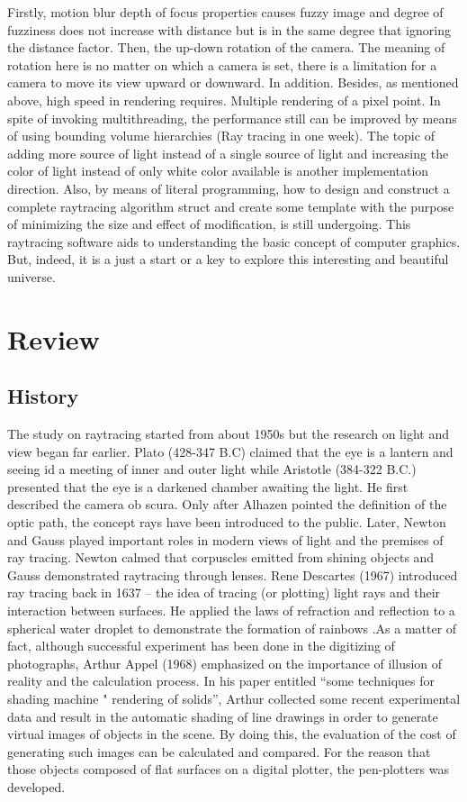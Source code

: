 \documentclass[11pt]{article}
\begin{document}
Firstly, motion blur depth of focus properties causes fuzzy image and degree of fuzziness does not increase with distance but is in the same degree that ignoring the distance factor. Then, the up-down rotation of the camera. The meaning of rotation here is no matter on which a camera is set, there is a limitation for a camera to move its view upward or downward. In addition. Besides, as mentioned above, high speed in rendering requires. Multiple rendering of a pixel point. In spite of invoking multithreading, the performance still can be improved by means of using bounding volume hierarchies (Ray tracing in one week). The topic of adding more source of light instead of a single source of light and increasing the color of light instead of only white color available is another implementation direction.
Also, by means of literal programming, how to design and construct a complete raytracing algorithm struct and create some template with the purpose of minimizing the size and effect of modification, is still undergoing. This raytracing software aids to understanding the basic concept of computer graphics. But, indeed, it is a just a start or a key to explore this interesting and beautiful universe.

\section{Review}
\subsection{History}
The study on raytracing started from about 1950s but the research on light and view began far earlier. Plato (428-347 B.C) claimed that the eye is a lantern and seeing id a meeting of inner and outer light while Aristotle (384-322 B.C.) presented that the eye is a darkened chamber awaiting the light. He first described the camera ob scura. Only after Alhazen pointed the definition of the optic path, the concept rays have been introduced to the public.
Later, Newton and Gauss played important roles in modern views of light and the premises of ray tracing. Newton calmed that corpuscles emitted from shining objects and Gauss demonstrated raytracing through lenses. Rene Descartes (1967) introduced ray tracing back in 1637 – the idea of tracing (or plotting) light rays and their interaction between surfaces. He applied the laws of refraction and reflection to a spherical water droplet to demonstrate the formation of rainbows .As a matter of fact, although successful experiment has been done in the digitizing of photographs, Arthur Appel (1968) emphasized on the importance of illusion of reality and the calculation process. In his paper entitled “some techniques for shading machine " rendering of solids”, Arthur collected some recent experimental data and result in the automatic shading of line drawings in order to generate virtual images of objects in the scene. By doing this, the evaluation of the cost of generating such images can be calculated and compared. For the reason that those objects composed of flat surfaces on a digital plotter, the pen-plotters was developed.
\end{document}
